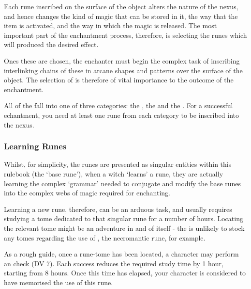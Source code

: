 Each rune inscribed on the surface of the object alters the nature of the nexus, and hence changes the kind of magic that can be stored in it, the way that the item is activated, and the way in which the magic is released. The most important part of the enchantment process, therefore, is selecting the runes which will produced the desired effect.

Ones these  are chosen, the enchanter must begin the complex task of inscribing interlinking chains of these  in arcane shapes and patterns over the surface of the object.  The selection of  is therefore of vital importance to the outcome of the enchantment. 


All of the  fall into one of three categories: the , the  and the . For a successful echantment, you need at least one rune from each category to be inscribed into the nexus. 


\subsubsection{Learning Runes}

Whilst, for simplicity, the runes are presented as singular entities within this rulebook (the `base rune'), when a witch `learns' a rune, they are actually learning the complex `grammar' needed to conjugate and modify the base runes into the complex webs of magic required for enchanting. 

Learning a new rune, therefore, can be an arduous task, and usually requires studying a tome dedicated to that singular rune for a number of hours. Locating the relevant tome might be an adventure in and of itself - the  is unlikely to stock any tomes regarding the use of \rune{\lues}, the necromantic rune, for example.

As a rough guide, once a rune-tome has been located, a character may perform an  check (DV 7). Each success reduces the required study time by 1 hour, starting from 8 hours. Once this time has elapsed, your character is considered to have memorised the use of this rune. 
\newcommand\runeRow[3]
{
	\rune{#2}	&	#1	&		\small #3 \\
}
\newcommand\esoRow[3]
{
	\runeRow{#1}{#2}{Used to contain magic associated with the \key{#3} discipline.}
}

\newcommand\runeList[3]
{
	\subsection{#1}

	#2

	\begin{center}
		\begin{rndtable}{c l p {6 cm} }
			\bf Rune	&	\bf Name	&	\bf Description
			\\
			
			#3
		\end{rndtable}
	\end{center}
}






